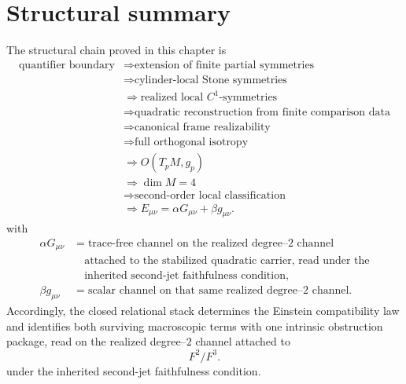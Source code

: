 \section{Structural summary}
\label{sec:einstein-summary}
The structural chain proved in this chapter is
\[
	\begin{aligned}
		\text{quantifier boundary}
			 & \Longrightarrow
		\text{extension of finite partial symmetries}
		\\
			 & \Longrightarrow
		\text{cylinder-local Stone symmetries}
		\\
			 & \Longrightarrow
		\text{realized local }C^1\text{-symmetries}
		\\
			 & \Longrightarrow
		\text{quadratic reconstruction from finite comparison data}
		\\
			 & \Longrightarrow
		\text{canonical frame realizability}
		\\
			 & \Longrightarrow
		\text{full orthogonal isotropy}
		\\
			 & \Longrightarrow O(T_pM,g_p)
		\\
			 & \Longrightarrow \dim M=4
		\\
			 & \Longrightarrow
		\text{second-order local classification}
		\\
			 & \Longrightarrow
		E_{\mu\nu}=\alpha G_{\mu\nu}+\beta g_{\mu\nu}.
	\end{aligned}
\]
with
\[
	\begin{aligned}
		\alpha G_{\mu\nu}
			 & =
		\text{trace-free channel on the realized degree--\(2\) channel}
		\\
			 & \quad\text{attached to the stabilized quadratic carrier, read under the}
		\\
			 & \quad\text{inherited second-jet faithfulness condition},
		\\
		\beta g_{\mu\nu}
			 & =
		\text{scalar channel on that same realized degree--\(2\) channel.}
	\end{aligned}
\]
Accordingly, the closed relational stack determines the Einstein
compatibility law and identifies both surviving macroscopic terms with
one intrinsic obstruction package, read on the realized degree--\(2\)
channel attached to
\[
	F^2/F^3.
\]
under the inherited second-jet faithfulness condition.
